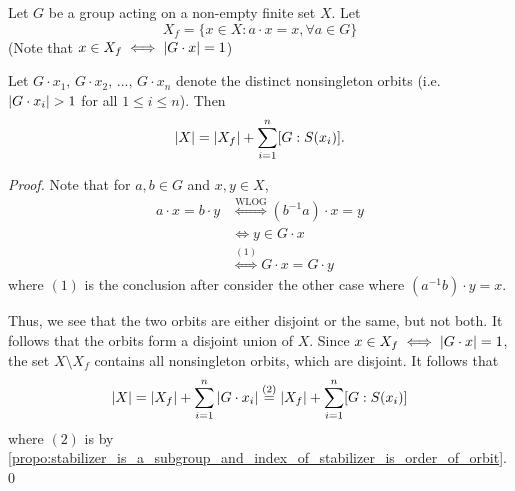 \begin{thm}
\label{thm:orbit_decomposition_theorem}
  Let $G$ be a group acting on a non-empty finite set $X$. Let
  \begin{equation*}
    X_f = \{x \in X : a \cdot x = x, \forall a \in G \}
  \end{equation*}
  (Note that $x \in X_f \iff \left|G \cdot x\right| = 1$)

  Let $G \cdot x_1, \, G \cdot x_2, \, ..., \, G \cdot x_n$ denote the distinct nonsingleton orbits (i.e. $\left|G \cdot x_i\right| > 1$ for all $1 \leq i \leq n$). Then
  \begin{equation*}
    \left|X\right| = \left|X_f\right| + \sum_{i = 1}^{n} [ G : S(x_i) ].
  \end{equation*}
\end{thm}

\begin{proof}
  Note that for $a, b \in G$ and $x, y \in X$,
  \begin{align*}
    a \cdot x = b \cdot y &\overset{\text{WLOG}}{\iff} (b^{-1}a) \cdot x = y \\
          &\iff y \in G \cdot x \\
          &\overset{(1)}{\iff} G \cdot x = G \cdot y
  \end{align*}
  where $(1)$ is the conclusion after consider the other case where $(a^{-1}b) \cdot y = x$.

  Thus, we see that the two orbits are either disjoint or the same, but not both. It follows that the orbits form a disjoint union of $X$. Since  $x \in X_f \iff \left|G \cdot x\right| = 1$, the set $X \setminus X_f$ contains all nonsingleton orbits, which are disjoint. It follows that
  \begin{equation*}
    \left|X\right| = \left|X_f\right| + \sum_{i = 1}^{n} \left|G \cdot x_i\right| \overset{(2)}{=} \left|X_f\right| + \sum_{i = 1}^{n} [G : S(x_i)]
  \end{equation*}
  where $(2)$ is by \cref{propo:stabilizer_is_a_subgroup_and_index_of_stabilizer_is_order_of_orbit}.\qed
\end{proof}



